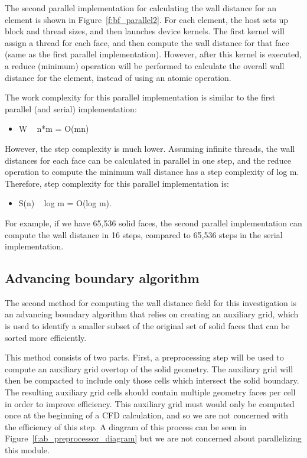 \documentclass[]{aiaa-tc}%
\begin{document}
The second parallel implementation for calculating the wall distance for an element is shown in Figure~\ref{f:bf_parallel2}.  For each element, the host sets up block and thread sizes, and then launches device kernels.  The first kernel will assign a thread for each face, and then compute the wall distance for that face (same as the first parallel implementation).  However, after this kernel is executed, a reduce (minimum) operation will be performed to calculate the overall wall distance for the element, instead of using an atomic operation.  

The work complexity for this parallel implementation is similar to the first parallel (and serial) implementation:

\begin{itemize}
  \item W ~ n*m = O(mn)
\end{itemize}

However, the step complexity is much lower.  Assuming infinite threads, the wall distances for each face can be calculated in parallel in one step, and the reduce operation to compute the minimum wall distance has a step complexity of log m.  Therefore, step complexity for this parallel implementation is: 

\begin{itemize}
  \item S(n) ~ log m = O(log m).
\end{itemize}

For example, if we have 65,536 solid faces, the second parallel implementation can compute the wall distance in 16 steps, compared to 65,536 steps in the serial implementation.

\subsection{Advancing boundary algorithm}
The second method for computing the wall distance field for this
investigation is an advancing boundary algorithm that relies on creating an
auxiliary grid, which is used to identify a smaller subset of the
original set of solid faces that can be sorted more efficiently.

This method consists of two parts. First, a preprocessing step will be
used to compute an auxiliary grid overtop of the solid geometry. The
auxiliary grid will then be compacted to include only those cells
which intersect the solid boundary. The resulting auxiliary grid cells
should contain multiple geometry faces per cell in order to improve
efficiency. This auxiliary grid must would only be computed once at the
beginning of a CFD calculation, and so we are not concerned with the
efficiency of this step. A diagram of this process can be seen in
Figure~\ref{f:ab_preprocessor_diagram} but we are not concerned about
parallelizing this module.
\end{document}
